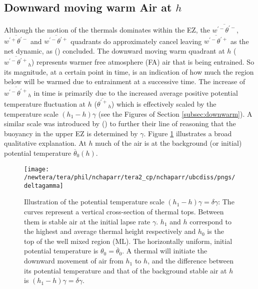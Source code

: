 \subsection{Downward moving warm Air at $h$}

 Although the motion of the thermals dominates within the \acs{EZ}, the $\overline{w^{'-}\theta^{'-}}$, $\overline{w^{'+}\theta^{'-}}$ and $\overline{w^{'-}\theta^{'+}}$ quadrants do approximately cancel leaving $\overline{w^{'-}\theta^{'+}}$ as the net dynamic, as \citeauthor{SullMoengStev} (\citeyear{SullMoengStev}) concluded. The downward moving warm quadrant at $h$ ($\overline{w^{'-}\theta^{'+}}_{h}$) represents warmer free atmosphere (\acs{FA}) air that is being entrained.  So its magnitude, at a certain point in time, is an indication of how much the region below will be warmed due to entrainment at a successive time.  The increase of $\overline{w^{'-}\theta^{'+}}_{h}$ in time is primarily due to the increased average positive potential temperature fluctuation at $h$ ($\overline{\theta^{'+}}_{h}$) which is effectively scaled by the temperature scale $(h_{1}-h)\gamma$ (see the Figures of Section \ref{subsec:downwarm}).  A similar scale was introduced by \citeauthor{GarciaMellado} (\citeyear{GarciaMellado}) to further their line of reasoning that the buoyancy in the upper \acs{EZ} is determined by $\gamma$. Figure \ref{fig:deltagamma} illustrates a broad qualitative explanation.  At $h$ much of the air is at the background (or initial) potential temperature $\overline{\theta}_{0}(h)$. 

\begin{figure}[htbp]
    \centering
    \texttt{[image: /newtera/tera/phil/nchaparr/tera2\_cp/nchaparr/ubcdiss/pngs/deltagamma]}
    \caption[Illustration of \acs{EZ} Potential Temperature Scale based on $\gamma$]{Illustration of the potential temperature scale $(h_{1}-h)\gamma = \delta \gamma$: The curves represent a vertical cross-section of thermal tops.  Between them is stable air at the initial lapse rate $\gamma$. $h_{1}$ and $h$ correspond to the highest and average thermal height respectively and $h_{0}$ is the top of the well mixed region (\acs{ML}).  The horizontally uniform, initial potential temperature is $\theta_{0} = \overline{\theta}_{0}$. A thermal will initiate the downward movement of air from $h_{1}$ to $h$, and the difference between its potential temperature and that of the background stable air at $h$ is $(h_{1}-h)\gamma = \delta \gamma$.}
    \label{fig:deltagamma}   %
\end{figure}

